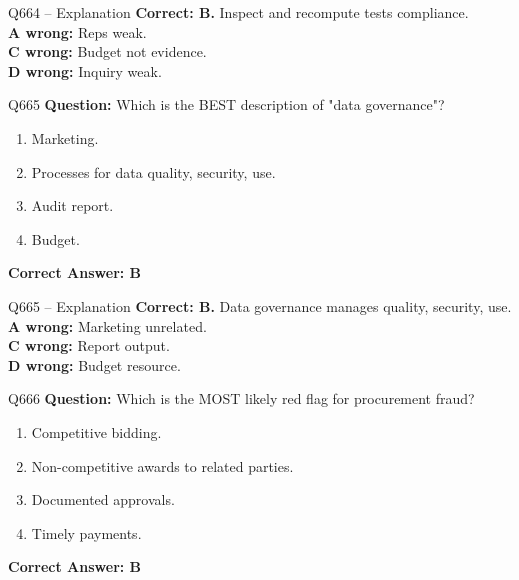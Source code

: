 \documentclass[aspectratio=169,10pt]{beamer}
\begin{document}
	\begin{frame}[t]{Q664 -- Explanation}
		\small
		\textbf{Correct: B.} Inspect and recompute tests compliance. \\[4pt]
		\textbf{A wrong:} Reps weak. \\[2pt]
		\textbf{C wrong:} Budget not evidence. \\[2pt]
		\textbf{D wrong:} Inquiry weak.
	\end{frame}
	
	\begin{frame}[t]{Q665}
		\small
		\textbf{Question:} Which is the BEST description of "data governance"?
		\begin{enumerate}[label=\Alph*.,itemsep=1pt,topsep=2pt]
			\item Marketing.
			\item Processes for data quality, security, use.
			\item Audit report.
			\item Budget.
		\end{enumerate}
		\vspace{4pt}
		\textbf{Correct Answer: B}
	\end{frame}
	
	\begin{frame}[t]{Q665 -- Explanation}
		\small
		\textbf{Correct: B.} Data governance manages quality, security, use. \\[4pt]
		\textbf{A wrong:} Marketing unrelated. \\[2pt]
		\textbf{C wrong:} Report output. \\[2pt]
		\textbf{D wrong:} Budget resource.
	\end{frame}
	
	\begin{frame}[t]{Q666}
		\small
		\textbf{Question:} Which is the MOST likely red flag for procurement fraud?
		\begin{enumerate}[label=\Alph*.,itemsep=1pt,topsep=2pt]
			\item Competitive bidding.
			\item Non-competitive awards to related parties.
			\item Documented approvals.
			\item Timely payments.
		\end{enumerate}
		\vspace{4pt}
		\textbf{Correct Answer: B}
	\end{frame}
	
\end{document}
